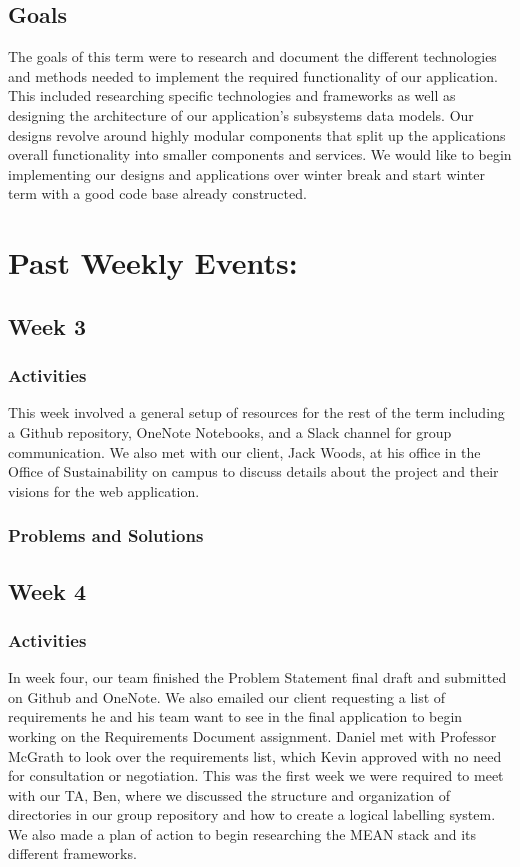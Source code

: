 \documentclass[journal,10pt,onecolumn,compsoc]{IEEEtran} \usepackage[margin=1.0in]{geometry} \usepackage{pdfpages}
\begin{document}
    \subsection{Goals}
    The goals of this term were to research and document the different technologies and methods needed to implement the required functionality of our application. This included researching specific technologies and frameworks as well as designing the architecture of our application's subsystems data models. Our designs revolve around highly modular components that split up the applications overall functionality into smaller components and services. We would like to begin implementing our designs and applications over winter break and start winter term with a good code base already constructed.
    
    \section{Past Weekly Events:}
    \subsection{Week 3}
    \subsubsection{Activities} 
    This week involved a general setup of resources for the rest of the term including a Github repository, OneNote Notebooks, and a Slack channel for group communication. We also met with our client, Jack Woods, at his office in the Office of Sustainability on campus to discuss details about the project and their visions for the web application.
    \subsubsection{Problems and Solutions} 
    \subsection{Week 4}
    \subsubsection{Activities} 
    In week four, our team finished the Problem Statement final draft and submitted on Github and OneNote. We also emailed our client requesting a list of requirements he and his team want to see in the final application to begin working on the Requirements Document assignment. Daniel met with Professor McGrath to look over the requirements list, which Kevin approved with no need for consultation or negotiation.
    \noindent This was the first week we were required to meet with our TA, Ben, where we discussed the structure and organization of directories in our group repository and how to create a logical labelling system. We also made a plan of action to begin researching the MEAN stack and its different frameworks.
    
\end{document}
